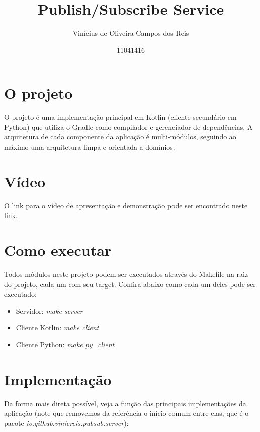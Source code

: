 \documentclass{article}
\title{Publish/Subscribe Service}
\author{Vinícius de Oliveira Campos dos Reis
\and 11041416}
\date{}
\begin{document}
    \maketitle

    \section{O projeto}\label{sec:introducao}

    O projeto é uma implementação principal em Kotlin (cliente secundário em Python) que utiliza o Gradle como compilador e gerenciador de dependências.
    A arquitetura de cada componente da aplicação é multi-módulos, seguindo ao máximo uma arquitetura limpa e orientada a domínios.

    \section{Vídeo}\label{sec:video}

    O link para o vídeo de apresentação e demonstração pode ser encontrado \href{https://youtu.be/zc2pk0FqJRg}{neste link}.

    \section{Como executar}\label{sec:como-executar}

    Todos módulos neste projeto podem ser executados através do Makefile na raiz do projeto, cada um com seu target.
    Confira abaixo como cada um deles pode ser executado:

    \begin{itemize}
        \item Servidor: \textit{make server}
        \item Cliente Kotlin: \textit{make client}
        \item Cliente Python: \textit{make py\_client}
    \end{itemize}

    \section{Implementação}\label{sec:implementacao}

    Da forma mais direta possível, veja a função das principais implementações da aplicação (note que removemos da referência o início comum entre elas, que é o pacote \textit{io.github.vinicreis.pubsub.server}):
\end{document}

